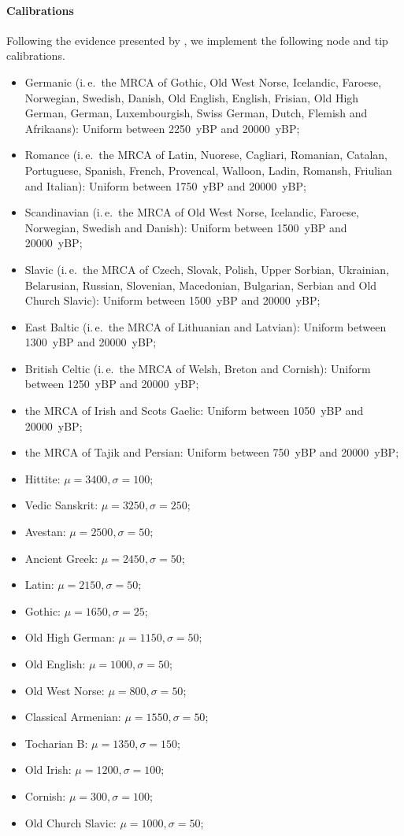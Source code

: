 \documentclass[a4paper,12pt]{scrartcl}
\begin{document}
\paragraph{Calibrations}
Following the evidence presented by \textcite[Tables 7 and 12]{chang2015ancestryconstrained}, we implement the following node and tip calibrations.
\begin{itemize}
  \item Germanic (i.\,e.\ the MRCA of Gothic, Old West Norse, Icelandic, Faroese, Norwegian, Swedish, Danish, Old English, English, Frisian, Old High German, German, Luxembourgish, Swiss German, Dutch, Flemish and Afrikaans): Uniform between 2250~yBP and 20000~yBP;
  \item Romance (i.\,e.\ the MRCA of Latin, Nuorese, Cagliari, Romanian, Catalan, Portuguese, Spanish, French, Provencal, Walloon, Ladin, Romansh, Friulian and Italian): Uniform between 1750~yBP and 20000~yBP;
  \item Scandinavian (i.\,e.\ the MRCA of Old West Norse, Icelandic, Faroese, Norwegian, Swedish and Danish): Uniform between 1500~yBP and 20000~yBP;
  \item Slavic (i.\,e.\ the MRCA of Czech, Slovak, Polish, Upper Sorbian, Ukrainian, Belarusian, Russian, Slovenian, Macedonian, Bulgarian, Serbian and Old Church Slavic): Uniform between 1500~yBP and 20000~yBP;
  \item East Baltic (i.\,e.\ the MRCA of Lithuanian and Latvian): Uniform between 1300~yBP and 20000~yBP;
  \item British Celtic (i.\,e.\ the MRCA of Welsh, Breton and Cornish): Uniform between 1250~yBP and 20000~yBP;
  \item the MRCA of Irish and Scots Gaelic: Uniform between 1050~yBP and 20000~yBP;
  \item the MRCA of Tajik and Persian: Uniform between 750~yBP and 20000~yBP;
  \item Hittite: $\mu=3400, \sigma=100$;
  \item Vedic Sanskrit: $\mu=3250, \sigma=250$;
  \item Avestan: $\mu=2500, \sigma=50$;
  \item Ancient Greek: $\mu=2450, \sigma=50$;
  \item Latin: $\mu=2150, \sigma=50$;
  \item Gothic: $\mu=1650, \sigma=25$;
  \item Old High German: $\mu=1150, \sigma=50$;
  \item Old English: $\mu=1000, \sigma=50$;
  \item Old West Norse: $\mu=800, \sigma=50$;
  \item Classical Armenian: $\mu=1550, \sigma=50$;
  \item Tocharian B: $\mu=1350, \sigma=150$;
  \item Old Irish: $\mu=1200, \sigma=100$;
  \item Cornish: $\mu=300, \sigma=100$;
  \item Old Church Slavic: $\mu=1000, \sigma=50$;
\end{itemize}
\end{document}
